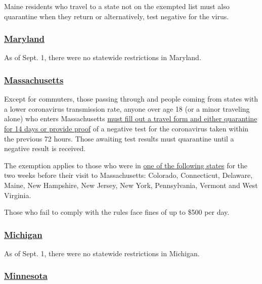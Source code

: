 Maine residents who travel to a state not on the exempted list must also
quarantine when they return or alternatively, test negative for the
virus.

\hypertarget{maryland}{%
\subsubsection{\texorpdfstring{\href{https://www.visitmaryland.org/article/travel-alerts}{Maryland}}{Maryland}}\label{maryland}}

As of Sept. 1, there were no statewide restrictions in Maryland.

\hypertarget{massachusetts}{%
\subsubsection{\texorpdfstring{\href{https://www.mass.gov/info-details/covid-19-updates-and-information}{Massachusetts}}{Massachusetts}}\label{massachusetts}}

Except for commuters, those passing through and people coming from
states with a lower coronavirus transmission rate, anyone over age 18
(or a minor traveling alone) who enters Massachusetts
\href{https://www.mass.gov/info-details/covid-19-travel-order}{must fill
out a travel form and either quarantine for 14 days or provide proof} of
a negative test for the coronavirus taken within the previous 72 hours.
Those awaiting test results must quarantine until a negative result is
received.

The exemption applies to those who were in
\href{https://www.mass.gov/info-details/covid-19-travel-order\#lower-risk-states-}{one
of the following states} for the two weeks before their visit to
Massachusetts: Colorado, Connecticut, Delaware, Maine, New Hampshire,
New Jersey, New York, Pennsylvania, Vermont and West Virginia.

Those who fail to comply with the rules face fines of up to \$500 per
day.

\hypertarget{michigan}{%
\subsubsection{\texorpdfstring{\href{https://www.michigan.gov/coronavirus/}{Michigan}}{Michigan}}\label{michigan}}

As of Sept. 1, there were no statewide restrictions in Michigan.

\hypertarget{minnesota}{%
\subsubsection{\texorpdfstring{\href{https://www.exploreminnesota.com/info/coronavirus-covid-19-information}{Minnesota}}{Minnesota}}\label{minnesota}}

